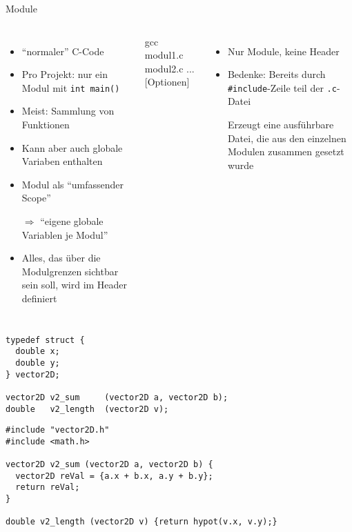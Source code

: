 
\begin{frame}[fragile]{Module}
%
\begin{columns}[T]
%
\begin{itemize}
\item \enquote{normaler} C-Code
\item Pro Projekt: nur ein Modul mit \texttt{int main()}
\item Meist: Sammlung von Funktionen
\item Kann aber auch globale Variaben enthalten
\item Modul als \enquote{umfassender Scope}
\item[$\Rightarrow$] \enquote{eigene globale Variablen je Modul}
\item Alles, das über die Modulgrenzen sichtbar sein soll, wird im Header definiert
\end{itemize}
%
\begin{cmdbox}
\scriptsize
gcc modul1.c modul2.c ... [Optionen]
\end{cmdbox}
%
\begin{itemize}
\item Nur Module, keine Header
\item Bedenke: Bereits durch \texttt{#include}-Zeile teil der \texttt{.c}-Datei
\item[\Thus] Erzeugt eine ausführbare Datei, die aus den einzelnen Modulen zusammen gesetzt wurde
\end{itemize}
\end{columns}
%
\end{frame}


\begin{frame}[fragile]
%
\vspace{-5pt}
\begin{codebox}
\begin{verbatim}
typedef struct {
  double x;
  double y;
} vector2D;

vector2D v2_sum     (vector2D a, vector2D b);
double   v2_length  (vector2D v);
\end{verbatim}
\end{codebox}
%
\begin{codebox}
\begin{verbatim}
#include "vector2D.h"
#include <math.h>

vector2D v2_sum (vector2D a, vector2D b) {
  vector2D reVal = {a.x + b.x, a.y + b.y}; 
  return reVal;
}

double v2_length (vector2D v) {return hypot(v.x, v.y);}
\end{verbatim}
\end{codebox}
%
\end{frame}

